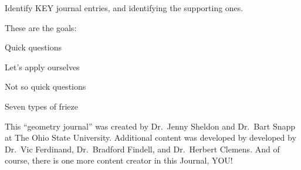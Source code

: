 \documentclass[handout,nooutcomes,noauthor]{ximera}
\begin{document}
Identify KEY journal entries, and identifying the supporting ones. 


These are the goals: 

Quick questions

Let's apply ourselves

Not so quick questions

Seven types of frieze






This ``geometry journal'' was created by Dr.\ Jenny Sheldon and
Dr.\ Bart Snapp at The Ohio State University. Additional content was
developed by developed by Dr.\ Vic Ferdinand, Dr.\ Bradford Findell,
and Dr.\ Herbert Clemens.  And of course, there is one more content
creator in this Journal, YOU!
\end{document}
